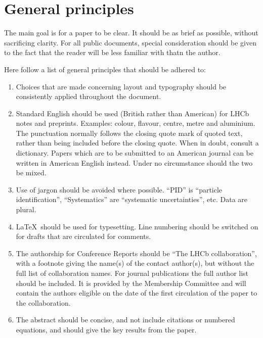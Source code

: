 \section{General principles}

The main goal is for a paper to be clear. It should be as brief as
possible, without sacrificing clarity. For all public documents,
special consideration should be given to the fact that the reader will
be less familiar with \lhcb thatn the author.

Here follow a list of general principles that should be adhered to:
\begin{enumerate}

\item Choices that are made concerning layout and typography
  should be consistently applied throughout the document.

\item Standard English should be used (British rather than American)
  for LHCb notes and preprints. Examples: colour, flavour, centre,
  metre and aluminium. The punctuation normally follows the closing
  quote mark of quoted text, rather than being included before the
  closing quote. When in doubt, consult a dictionary. Papers which are
  to be submitted to an American journal can be written in American
  English instead. Under no circumstance should the two be mixed.

\item Use of jargon should be avoided where possible.  ``PID'' is
  ``particle identification'', ``Systematics'' are ``systematic
  uncertainties'', etc. Data are plural.

\item \LaTeX\ should be used for typesetting. Line numbering should be
  switched on for drafts that are circulated for comments.

\item The authorship for Conference Reports should be ``The LHCb
  collaboration'', with a footnote giving the name(s) of the contact
  author(s), but without the full list of collaboration names. For
  journal publications the full author list should be included. It is
  provided by the Membership Committee and will contain the authors
  eligible on the date of the first circulation of the paper to the
  collaboration.

\item The abstract should be concise, and not include citations or
  numbered equations, and should give the key results from the paper.


\end{enumerate}
